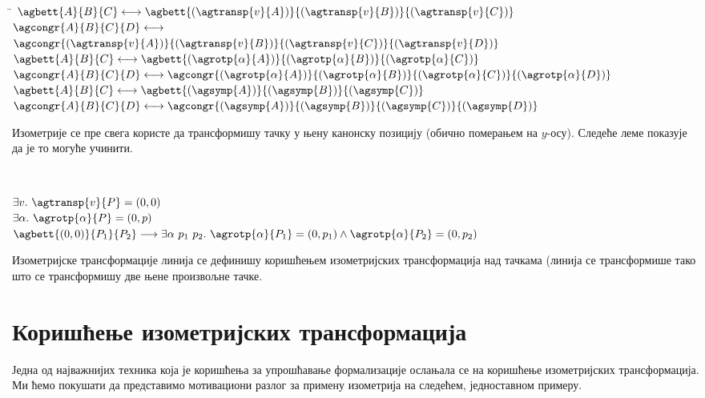 {\tt
\begin{tabbing}
\hspace{5mm}\=\kill
$ \agbett{A}{B}{C} \longleftrightarrow \agbett{(\agtransp{v}{A})}{(\agtransp{v}{B})}{(\agtransp{v}{C})}$\\
$\agcongr{A}{B}{C}{D} \longleftrightarrow$\\
\> $\agcongr{(\agtransp{v}{A})}{(\agtransp{v}{B})}{(\agtransp{v}{C})}{(\agtransp{v}{D})}$\\
$\agbett{A}{B}{C} \longleftrightarrow \agbett{(\agrotp{\alpha}{A})}{(\agrotp{\alpha}{B})}{(\agrotp{\alpha}{C})}$\\
$\agcongr{A}{B}{C}{D} \longleftrightarrow
   \agcongr{(\agrotp{\alpha}{A})}{(\agrotp{\alpha}{B})}{(\agrotp{\alpha}{C})}{(\agrotp{\alpha}{D})}$\\
$\agbett{A}{B}{C} \longleftrightarrow \agbett{(\agsymp{A})}{(\agsymp{B})}{(\agsymp{C})}$\\
$\agcongr{A}{B}{C}{D} \longleftrightarrow
   \agcongr{(\agsymp{A})}{(\agsymp{B})}{(\agsymp{C})}{(\agsymp{D})}$
\end{tabbing}
}

Изометрије се пре свега користе да трансформишу тачку у њену канонску
позицију (обично померањем на $y$-осу).  Следеће леме показује да је
то могуће учинити.

{\tt
\begin{tabbing}
$\exists v.\ \agtransp{v}{P} = (0, 0)$\\
$\exists \alpha.\ \agrotp{\alpha}{P} = (0, p)$\\
$\agbett{(0, 0)}{P_1}{P_2} \longrightarrow \exists \alpha\ p_1\
p_2.\ \agrotp{\alpha}{P_1} = (0, p_1) \wedge \agrotp{\alpha}{P_2}
= (0, p_2)$
\end{tabbing}
}

Изометријске трансформације линија се дефинишу коришћењем
изометријских трансформација над тачкама (линија се трансформише тако
што се трансформишу две њене произвољне тачке.

\section{Коришћење изометријских трансформација}
\label{sec:iso}
Једна од најважнијих техника која је коришћења за упрошћавање
формализације ослањала се на коришћење изометријских
трансформација. Ми ћемо покушати да представимо мотивациони разлог за
примену изометрија на следећем, једноставном примеру.

